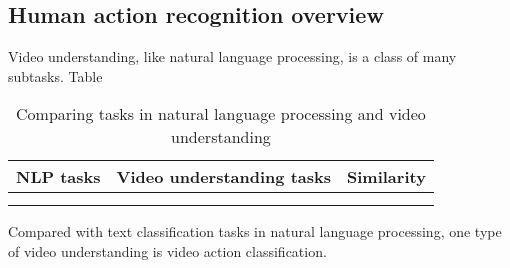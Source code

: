 \subsection{Human action recognition overview}
Video understanding, like natural language processing, is a class of many subtasks.
Table

\begin{table}[ht!]
\begin{tabularx}{\textwidth}{|l|l|X|}
\hline
NLP tasks & Video understanding tasks & Similarity \\ \hline
                            &                     &            \\ \hline
                            &                     &            \\ \hline
\end{tabularx}
\caption{Comparing tasks in natural language processing and video understanding}
\label{tab:Comparing tasks in natural}
\end{table}

Compared with text classification tasks in natural language processing, one type of video understanding is video action classification.

\citet{wu2017recent}

\citet{chen2020monocular}
